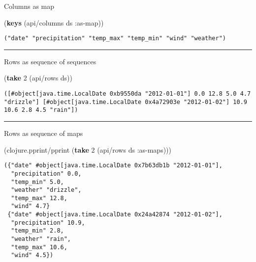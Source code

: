 \documentclass[]{article}
\newenvironment{Shaded}{\begin{snugshade}}{\end{snugshade}}
\newcommand{\KeywordTok}[1]{\textcolor[rgb]{0.13,0.29,0.53}{\textbf{#1}}}
\newcommand{\DecValTok}[1]{\textcolor[rgb]{0.00,0.00,0.81}{#1}}
\newcommand{\AttributeTok}[1]{\textcolor[rgb]{0.77,0.63,0.00}{#1}}
\newcommand{\NormalTok}[1]{#1}
\begin{document}
Columns as map

\begin{Shaded}
\begin{Highlighting}[]
\NormalTok{(}\KeywordTok{keys}\NormalTok{ (api/columns ds }\AttributeTok{:as-map}\NormalTok{))}
\end{Highlighting}
\end{Shaded}

\begin{verbatim}
("date" "precipitation" "temp_max" "temp_min" "wind" "weather")
\end{verbatim}

\begin{center}\rule{0.5\linewidth}{0.5pt}\end{center}

Rows as sequence of sequences

\begin{Shaded}
\begin{Highlighting}[]
\NormalTok{(}\KeywordTok{take} \DecValTok{2}\NormalTok{ (api/rows ds))}
\end{Highlighting}
\end{Shaded}

\begin{verbatim}
([#object[java.time.LocalDate 0xb9550da "2012-01-01"] 0.0 12.8 5.0 4.7 "drizzle"] [#object[java.time.LocalDate 0x4a72903e "2012-01-02"] 10.9 10.6 2.8 4.5 "rain"])
\end{verbatim}

\begin{center}\rule{0.5\linewidth}{0.5pt}\end{center}

Rows as sequence of maps

\begin{Shaded}
\begin{Highlighting}[]
\NormalTok{(clojure.pprint/pprint (}\KeywordTok{take} \DecValTok{2}\NormalTok{ (api/rows ds }\AttributeTok{:as-maps}\NormalTok{)))}
\end{Highlighting}
\end{Shaded}

\begin{verbatim}
({"date" #object[java.time.LocalDate 0x7b63db1b "2012-01-01"],
  "precipitation" 0.0,
  "temp_min" 5.0,
  "weather" "drizzle",
  "temp_max" 12.8,
  "wind" 4.7}
 {"date" #object[java.time.LocalDate 0x24a42874 "2012-01-02"],
  "precipitation" 10.9,
  "temp_min" 2.8,
  "weather" "rain",
  "temp_max" 10.6,
  "wind" 4.5})
\end{verbatim}
\end{document}
